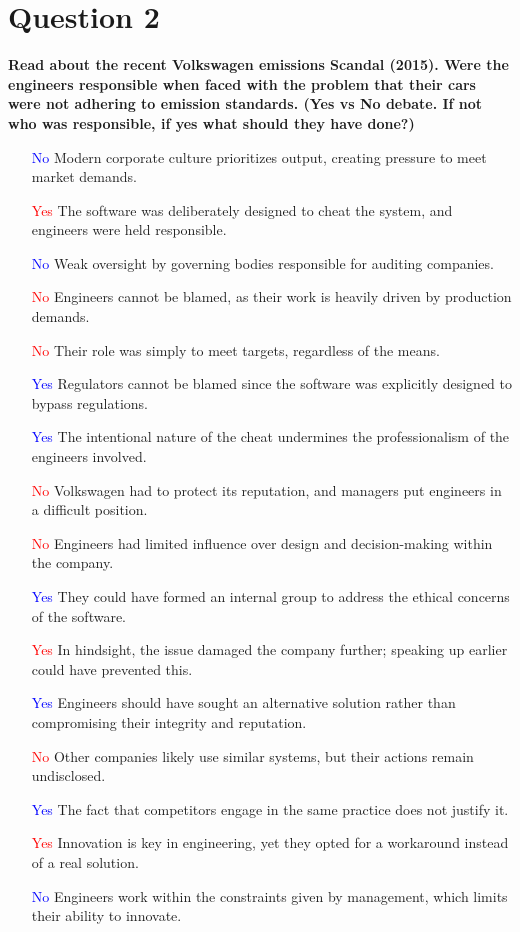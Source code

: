 \documentclass[12pt]{article}
\begin{document}
\section{Question 2}
\textbf{Read about the recent Volkswagen emissions Scandal (2015). Were the engineers responsible when faced with the problem that their cars were not adhering to emission standards. (Yes vs No debate. If not who was responsible, if yes what should they have done?)}

\begin{itemize}
    \item [\textcolor{blue}{No}] Modern corporate culture prioritizes output, creating pressure to meet market demands.
    \item [\textcolor{red}{Yes}] The software was deliberately designed to cheat the system, and engineers were held responsible.
    \item [\textcolor{blue}{No}] Weak oversight by governing bodies responsible for auditing companies.
    \item [\textcolor{red}{No}] Engineers cannot be blamed, as their work is heavily driven by production demands.
    \item [\textcolor{red}{No}] Their role was simply to meet targets, regardless of the means.
    \item [\textcolor{blue}{Yes}] Regulators cannot be blamed since the software was explicitly designed to bypass regulations.
    \item [\textcolor{blue}{Yes}] The intentional nature of the cheat undermines the professionalism of the engineers involved.
    \item [\textcolor{red}{No}] Volkswagen had to protect its reputation, and managers put engineers in a difficult position.
    \item [\textcolor{red}{No}] Engineers had limited influence over design and decision-making within the company.
    \item [\textcolor{blue}{Yes}] They could have formed an internal group to address the ethical concerns of the software.
    \item [\textcolor{red}{Yes}] In hindsight, the issue damaged the company further; speaking up earlier could have prevented this.
    \item [\textcolor{blue}{Yes}] Engineers should have sought an alternative solution rather than compromising their integrity and reputation.
    \item [\textcolor{red}{No}] Other companies likely use similar systems, but their actions remain undisclosed.
    \item [\textcolor{blue}{Yes}] The fact that competitors engage in the same practice does not justify it.
    \item [\textcolor{red}{Yes}] Innovation is key in engineering, yet they opted for a workaround instead of a real solution.
    \item [\textcolor{blue}{No}] Engineers work within the constraints given by management, which limits their ability to innovate.
\end{itemize}
\end{document}
